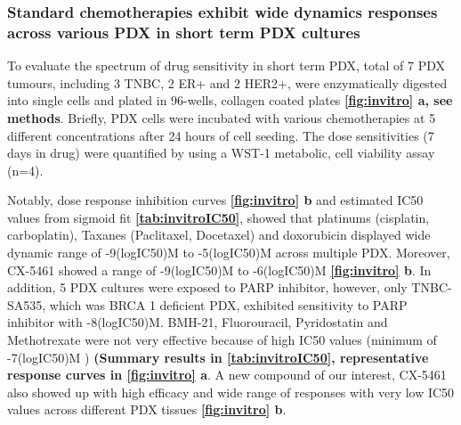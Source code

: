 \subsubsection{Standard chemotherapies exhibit wide dynamics responses across various PDX in short term PDX cultures}

To evaluate the spectrum of drug sensitivity in short term PDX,
total of 7 PDX tumours, including 3 TNBC, 2 ER+ and 2 HER2+, were enzymatically digested into single cells and plated in 96-wells, collagen coated plates \textbf{\autoref{fig:invitro} a, see methods}. 
Briefly, PDX cells were incubated with various chemotherapies at 5 different concentrations after 24 hours of cell seeding. The dose sensitivities (7 days in drug) were quantified by using a WST-1 metabolic, cell viability assay (n=4). 

Notably, dose response inhibition curves \textbf{\autoref{fig:invitro} b} and estimated IC50 values from sigmoid fit \textbf{\autoref{tab:invitroIC50}}, showed that platinums (cisplatin, carboplatin), Taxanes (Paclitaxel, Docetaxel) and doxorubicin displayed wide dynamic range of -9(logIC50)M to -5(logIC50)M across multiple PDX. Moreover, CX-5461 showed a range of -9(logIC50)M to -6(logIC50)M \textbf{\autoref{fig:invitro} b}. In addition, 5 PDX cultures were exposed to PARP inhibitor, however, only TNBC-SA535, which was BRCA 1 deficient PDX, exhibited sensitivity to PARP inhibitor with -8(logIC50)M. 
BMH-21, Fluorouracil, Pyridostatin and Methotrexate were not very effective because of high IC50 values (minimum of -7(logIC50)M ) \textbf{(Summary results in \autoref{tab:invitroIC50}, representative response curves in \autoref{fig:invitro} a}. A new compound of our interest, CX-5461 also showed up with high efficacy and wide range of responses with very low IC50 values across different PDX tissues \textbf{\autoref{fig:invitro} b}. 



